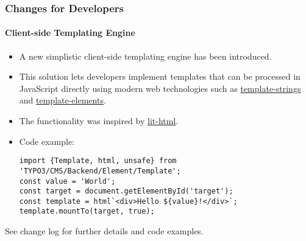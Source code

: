 %

\begin{frame}[fragile]
	\frametitle{Changes for Developers}
	\framesubtitle{Client-side Templating Engine}

	\lstset{basicstyle=\tiny\ttfamily}

	\begin{itemize}
		\item A new simplistic client-side templating engine has been introduced.
		\item This solution lets developers implement templates that can be processed
			in JavaScript directly using modern web technologies such as
			\href{https://developer.mozilla.org/en-US/docs/Web/JavaScript/Reference/Template_literals}{template-strings}
			and
			\href{https://developer.mozilla.org/de/docs/Web/HTML/Element/template}{template-elements}.
		\item The functionality was inspired by \href{https://lit-html.polymer-project.org/}{lit-html}.
		\item Code example:
\begin{lstlisting}
import {Template, html, unsafe} from 'TYPO3/CMS/Backend/Element/Template';
const value = 'World';
const target = document.getElementById('target');
const template = html`<div>Hello ${value}!</div>`;
template.mountTo(target, true);
\end{lstlisting}
	\end{itemize}
		\item See change log for further details and code examples.
\end{frame}

